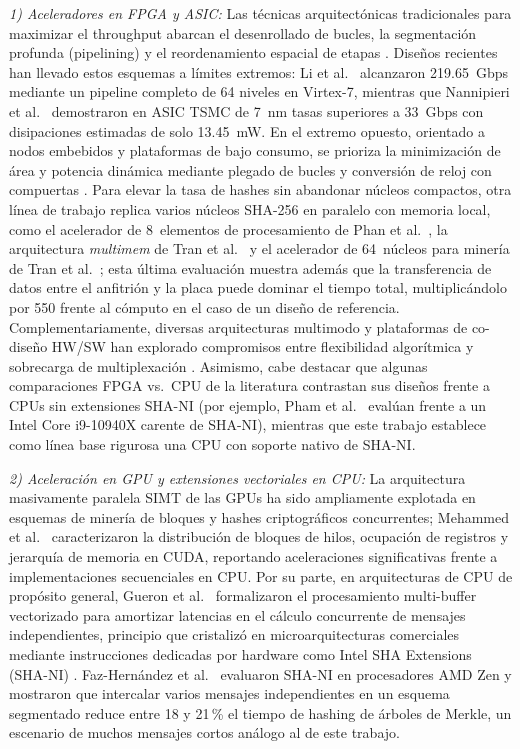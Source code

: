 \documentclass[conference]{IEEEtran}
\begin{document}
\textit{1) Aceleradores en FPGA y ASIC:} Las técnicas arquitectónicas tradicionales para maximizar el throughput abarcan el desenrollado de bucles, la segmentación profunda (pipelining) y el reordenamiento espacial de etapas \cite{michail2009, chaves2006, r3}. Diseños recientes han llevado estos esquemas a límites extremos: Li et al.~\cite{r2} alcanzaron 219.65~Gbps mediante un pipeline completo de 64 niveles en Virtex-7, mientras que Nannipieri et al.~\cite{nannipieri2021} demostraron en ASIC TSMC de 7~nm tasas superiores a 33~Gbps con disipaciones estimadas de solo 13.45~mW. En el extremo opuesto, orientado a nodos embebidos y plataformas de bajo consumo, se prioriza la minimización de área y potencia dinámica mediante plegado de bucles y conversión de reloj con compuertas \cite{martino2020, martino_iot2020, r4, gad2020low}. Para elevar la tasa de hashes sin abandonar núcleos compactos, otra línea de trabajo replica varios núcleos SHA-256 en paralelo con memoria local, como el acelerador de 8~elementos de procesamiento de Phan et al.~\cite{phan2021multicore}, la arquitectura \textit{multimem} de Tran et al.~\cite{tran2021multimem} y el acelerador de 64~núcleos para minería de Tran et al.~\cite{tran2021bca}; esta última evaluación muestra además que la transferencia de datos entre el anfitrión y la placa puede dominar el tiempo total, multiplicándolo por 550 frente al cómputo en el caso de un diseño de referencia. Complementariamente, diversas arquitecturas multimodo y plataformas de co-diseño HW/SW han explorado compromisos entre flexibilidad algorítmica y sobrecarga de multiplexación \cite{r1, kammoun2020}. Asimismo, cabe destacar que algunas comparaciones FPGA vs.~CPU de la literatura contrastan sus diseños frente a CPUs sin extensiones SHA-NI (por ejemplo, Pham et al.~\cite{r1} evalúan frente a un Intel Core i9-10940X carente de SHA-NI), mientras que este trabajo establece como línea base rigurosa una CPU con soporte nativo de SHA-NI.

\textit{2) Aceleración en GPU y extensiones vectoriales en CPU:} La arquitectura masivamente paralela SIMT de las GPUs ha sido ampliamente explotada en esquemas de minería de bloques y hashes criptográficos concurrentes; Mehammed et al.~\cite{ijisrt2021, mehammed2025} caracterizaron la distribución de bloques de hilos, ocupación de registros y jerarquía de memoria en CUDA, reportando aceleraciones significativas frente a implementaciones secuenciales en CPU. Por su parte, en arquitecturas de CPU de propósito general, Gueron et al.~\cite{gueron2012simultaneous} formalizaron el procesamiento multi-buffer vectorizado para amortizar latencias en el cálculo concurrente de mensajes independientes, principio que cristalizó en microarquitecturas comerciales mediante instrucciones dedicadas por hardware como Intel SHA Extensions (SHA-NI) \cite{gulley2013intel}. Faz-Hernández et al.~\cite{fazhernandez2018sok} evaluaron SHA-NI en procesadores AMD Zen y mostraron que intercalar varios mensajes independientes en un esquema segmentado reduce entre 18 y 21\,\% el tiempo de hashing de árboles de Merkle, un escenario de muchos mensajes cortos análogo al de este trabajo.
\end{document}

